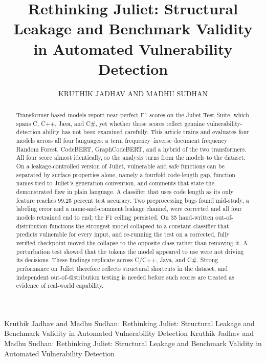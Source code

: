 \documentclass{ieeeaccess}
\begin{document}

\title{Rethinking Juliet: Structural Leakage and Benchmark Validity in Automated Vulnerability Detection}

\author{\uppercase{Kruthik Jadhav} AND
\uppercase{Madhu Sudhan}}

\address[1]{New York University, New York, NY 10003 USA (e-mail: kj2578@nyu.edu)}
\address[2]{Dayananda Sagar Academy of Technology and Management, Bengaluru, Karnataka 560078, India (e-mail: smadhu6364@gmail.com)}


\markboth
{Kruthik Jadhav and Madhu Sudhan: Rethinking Juliet: Structural Leakage and Benchmark Validity in Automated Vulnerability Detection}
{Kruthik Jadhav and Madhu Sudhan: Rethinking Juliet: Structural Leakage and Benchmark Validity in Automated Vulnerability Detection}


\begin{abstract}
Transformer-based models report near-perfect F1 scores on the Juliet Test Suite, which spans C, C++, Java, and C\#, yet whether those scores reflect genuine vulnerability-detection ability has not been examined carefully. This article trains and evaluates four models across all four languages: a term frequency--inverse document frequency Random Forest, CodeBERT, GraphCodeBERT, and a hybrid of the two transformers. All four score almost identically, so the analysis turns from the models to the dataset. On a leakage-controlled version of Juliet, vulnerable and safe functions can be separated by surface properties alone, namely a fourfold code-length gap, function names tied to Juliet's generation convention, and comments that state the demonstrated flaw in plain language. A classifier that uses code length as its only feature reaches 99.25 percent test accuracy. Two preprocessing bugs found mid-study, a labeling error and a name-and-comment leakage channel, were corrected and all four models retrained end to end; the F1 ceiling persisted. On 35 hand-written out-of-distribution functions the strongest model collapsed to a constant classifier that predicts vulnerable for every input, and re-running the test on a corrected, fully verified checkpoint moved the collapse to the opposite class rather than removing it. A perturbation test showed that the tokens the model appeared to use were not driving its decisions. These findings replicate across C/C++, Java, and C\#. Strong performance on Juliet therefore reflects structural shortcuts in the dataset, and independent out-of-distribution testing is needed before such scores are treated as evidence of real-world capability.
\end{abstract}
\end{document}
